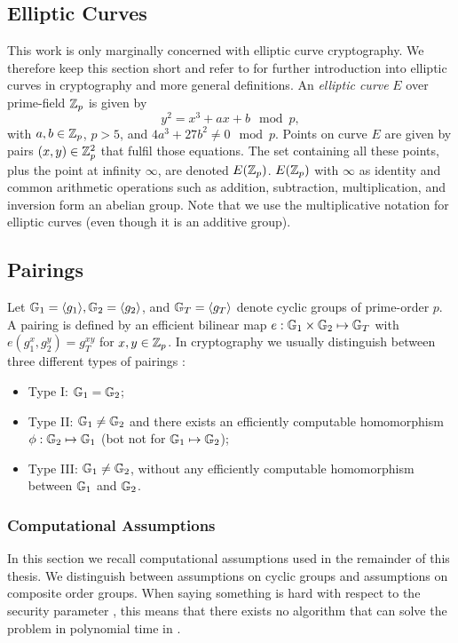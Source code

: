 \subsection{Elliptic Curves}
This work is only marginally concerned with elliptic curve cryptography.
We therefore keep this section short and refer to \citet{HankersonMS03} for further introduction into elliptic curves in cryptography and more general definitions.
An \emph{elliptic curve} $E$ over prime-field $\ZZ_p$ is given by 
\[
  y^2 = x^3 + ax + b \mod p,
\]
with $a,b\in\ZZ_p$, $p>5$, and $4a^3 + 27b^2 \not= 0 \mod p$.
Points on curve $E$ are given by pairs $(x,y)\in\ZZ^2_p$ that fulfil those equations.
The set containing all these points, plus the point at infinity $\infty$, are denoted $E(\ZZ_p)$.
$E(\ZZ_p)$ with $\infty$ as identity and common arithmetic operations such as addition, subtraction, multiplication, and inversion form an abelian group.
Note that we use the multiplicative notation for elliptic curves (even though it is an additive group).

\subsection{Pairings}
Let $\GG_1=\genG[1], \GG_2=\genG[2]$, and $\GG_T=\genG[T]$ denote cyclic groups of prime-order $p$.
A pairing is defined by an efficient bilinear map $e: \GG_1 \times \GG_2 \mapsto \GG_T$ with $e(g_1^x, g_2^y) = g_T^{xy}$ for $x,y\in\ZZ_p$.
In cryptography we usually distinguish between three different types of pairings \cite{GalbraithPS08}:

\begin{itemize}
  \item Type I: $\GG_1 = \GG_2$;
  \item Type II: $\GG_1 \not= \GG_2$ and there exists an efficiently computable homomorphism $\phi: \GG_2 \mapsto \GG_1$ (bot not for $\GG_1 \mapsto \GG_2$);
  \item Type III: $\GG_1 \not= \GG_2$, without any efficiently computable homomorphism between $\GG_1$ and $\GG_2$.
\end{itemize}

\subsubsection{Computational Assumptions}
In this section we recall computational assumptions used in the remainder of this thesis.
We distinguish between assumptions on cyclic groups and assumptions on composite order groups.
When saying something is hard with respect to the security parameter \secpar, this means that there exists no algorithm that can solve the problem in polynomial time in \secpar.

